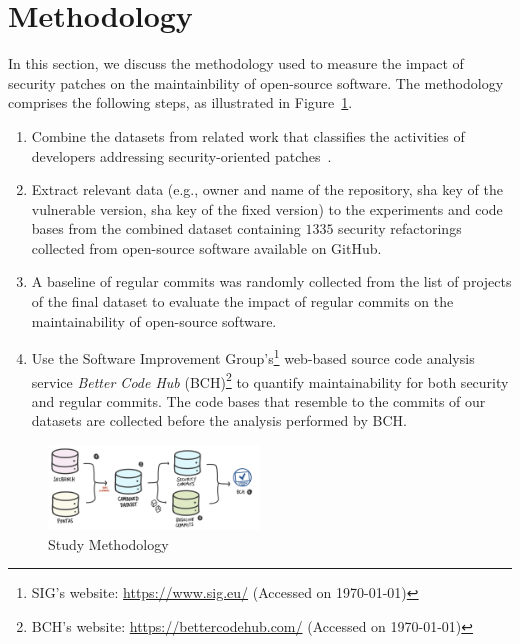 \documentclass[10pt,conference]{IEEEtran}
\begin{document}
\section{Methodology}\label{sec:methodology}
%
In this section, we discuss the methodology used to measure
the impact of security patches on the maintainbility of open-source
software. The methodology comprises the following steps, as illustrated in
Figure~\ref{fig:met}.
%
\begin{enumerate}
	\item Combine the datasets from related work that classifies
the activities of developers addressing security-oriented patches~\cite{Reis:2017:IJSSE, 10.1109/MSR.2019.00064}.
%
	\item
	Extract relevant data (e.g., owner and name of
	the repository, sha key of the vulnerable version, sha key of the fixed version) to the experiments and 
	code bases from the combined dataset containing $1335$ security
	refactorings collected from open-source software available on
	GitHub.
%
	\item A baseline of regular commits was randomly collected from the list of
	projects of the final dataset to evaluate the impact of regular commits on the
	maintainability of open-source software.
%
  \item Use the Software Improvement Group's\footnote{SIG's website: \url{https://www.sig.eu/} 
  (Accessed on \today{})} web-based source code analysis
  service \emph{Better Code Hub} (BCH)\footnote{BCH's website:
  \url{https://bettercodehub.com/} (Accessed on \today{})} to quantify maintainability
  for both security and regular commits. The code bases that resemble to the commits
  of our datasets are collected before the analysis performed by BCH.
\end{enumerate}
%
\begin{figure}[h]
 	\centering 	
	\includegraphics[width=0.5\textwidth]{figures/methodology.pdf}
 	\caption{Study Methodology}
	\label{fig:met}
\end{figure}
%
\end{document}
